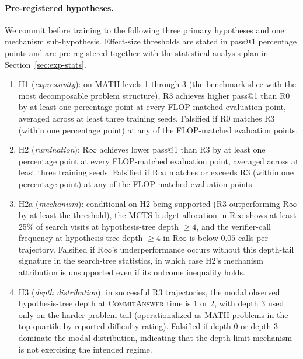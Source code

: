 \paragraph{Pre-registered hypotheses.}
We commit before training to the following three primary hypotheses
and one mechanism sub-hypothesis. Effect-size thresholds are stated
in pass@1 percentage points and are pre-registered together with the
statistical analysis plan in Section~\ref{sec:exp-stats}.
\begin{enumerate}[leftmargin=*]
  \item H1 (\emph{expressivity}): on MATH levels 1 through 3 (the
        benchmark slice with the most decomposable problem structure),
        R3 achieves higher pass@1 than R0 by at least one percentage
        point at every FLOP-matched evaluation point, averaged across
        at least three training seeds. Falsified if R0 matches R3
        (within one percentage point) at any of the
        FLOP-matched evaluation points.
  \item H2 (\emph{rumination}): R$\infty$ achieves lower pass@1 than
        R3 by at least one percentage point at every FLOP-matched
        evaluation point, averaged across at least three training
        seeds. Falsified if R$\infty$ matches or exceeds R3 (within
        one percentage point) at any of the FLOP-matched evaluation
        points.
  \item H2a (\emph{mechanism}): conditional on H2 being supported (R3
        outperforming R$\infty$ by at least the threshold), the MCTS
        budget allocation in R$\infty$ shows at least 25\% of search
        visits at hypothesis-tree depth $\geq 4$, and the
        verifier-call frequency at hypothesis-tree depth $\geq 4$ in
        R$\infty$ is below $0.05$ calls per trajectory. Falsified if
        R$\infty$'s underperformance occurs without this depth-tail
        signature in the search-tree statistics, in which case H2's
        mechanism attribution is unsupported even if its outcome
        inequality holds.
  \item H3 (\emph{depth distribution}): in successful R3 trajectories,
        the modal observed hypothesis-tree depth at
        \textsc{CommitAnswer} time is $1$ or $2$, with depth $3$ used
        only on the harder problem tail (operationalized as MATH
        problems in the top quartile by reported difficulty rating).
        Falsified if depth $0$ or depth $3$ dominate the modal
        distribution, indicating that the depth-limit mechanism is
        not exercising the intended regime.
\end{enumerate}

